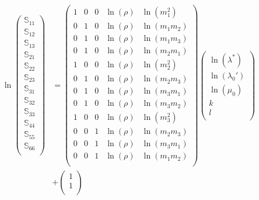\documentclass[a4paper,fleqn]{DC_ArtStyle}
\begin{document}
\begin{equation}
	\begin{split}
	\ln
	\begin{pmatrix}
		\mathbb{S}_{11} \\
		\mathbb{S}_{12} \\
		\mathbb{S}_{13} \\
		\mathbb{S}_{21} \\
		\mathbb{S}_{22} \\
		\mathbb{S}_{23} \\
		\mathbb{S}_{31} \\
		\mathbb{S}_{32} \\
		\mathbb{S}_{33} \\
		\mathbb{S}_{44} \\
		\mathbb{S}_{55} \\
		\mathbb{S}_{66} \\
	\end{pmatrix} & = \begin{pmatrix}
		1 & 0 & 0 & \ln(\rho) & \ln(m_1^2) \\
		0 & 1 & 0 & \ln(\rho) & \ln(m_1 m_2) \\
		0 & 1 & 0 & \ln(\rho) & \ln(m_1 m_3) \\
		0 & 1 & 0 & \ln(\rho) & \ln(m_2 m_1) \\
		1 & 0 & 0 & \ln(\rho) & \ln(m_2^2) \\
		0 & 1 & 0 & \ln(\rho) & \ln(m_2 m_3) \\
		0 & 1 & 0 & \ln(\rho) & \ln(m_3 m_1) \\
		0 & 1 & 0 & \ln(\rho) & \ln(m_3 m_2) \\
		1 & 0 & 0 & \ln(\rho) & \ln(m_3^2) \\
		0 & 0 & 1 & \ln(\rho) & \ln(m_2 m_3) \\
		0 & 0 & 1 & \ln(\rho) & \ln(m_3 m_1) \\
		0 & 0 & 1 & \ln(\rho) & \ln(m_1 m_2) \\
	\end{pmatrix} \begin{pmatrix}
		\ln(\lambda^{*}) \\
		\ln(\lambda_0') \\
		\ln(\mu_0) \\
		k \\
		l \\
	\end{pmatrix}\\ & + \begin{pmatrix}
		1 \\
		1 \\

\end{pmatrix}
\end{split}
\end{equation}
\end{document}
